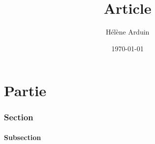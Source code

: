 \documentclass[a4paper,11pt]{article}
\title{Article}
\author{Hélène Arduin}
\date{\today}
\begin{document}
\maketitle

\part{Partie}
\section{Section}
\subsection{Subsection}
\end{document}
